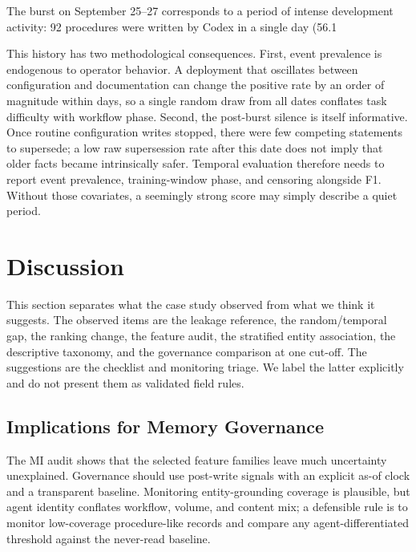 \documentclass[sigconf,nonacm]{acmart}
\begin{document}
The burst on September 25--27 corresponds to a period of intense development activity: 92 procedures were written by Codex in a single day (56.1%

This history has two methodological consequences. First, event prevalence is endogenous to operator behavior. A deployment that oscillates between configuration and documentation can change the positive rate by an order of magnitude within days, so a single random draw from all dates conflates task difficulty with workflow phase. Second, the post-burst silence is itself informative. Once routine configuration writes stopped, there were few competing statements to supersede; a low raw supersession rate after this date does not imply that older facts became intrinsically safer. Temporal evaluation therefore needs to report event prevalence, training-window phase, and censoring alongside F1. Without those covariates, a seemingly strong score may simply describe a quiet period.

\section{Discussion}
\label{sec:discussion}

This section separates what the case study observed from what we think it suggests. The observed items are the leakage reference, the random/temporal gap, the ranking change, the feature audit, the stratified entity association, the descriptive taxonomy, and the governance comparison at one cut-off. The suggestions are the checklist and monitoring triage. We label the latter explicitly and do not present them as validated field rules.

\subsection{Implications for Memory Governance}
The MI audit shows that the selected feature families leave much uncertainty unexplained. Governance should use post-write signals with an explicit as-of clock and a transparent baseline. Monitoring entity-grounding coverage is plausible, but agent identity conflates workflow, volume, and content mix; a defensible rule is to monitor low-coverage procedure-like records and compare any agent-differentiated threshold against the never-read baseline.
\end{document}
